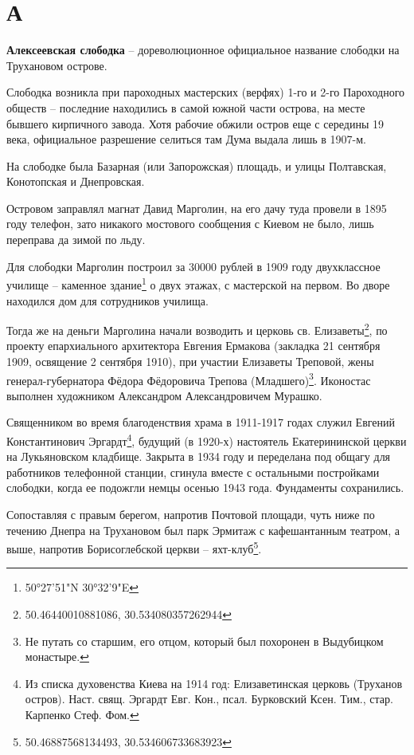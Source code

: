 \chapter*{А}

\textbf{Алексеевская слободка} –  дореволюционное официальное название слободки на Трухановом острове.

Слободка возникла при пароходных мастерских (верфях) 1-го и 2-го Пароходного обществ – последние находились в самой южной части острова, на месте бывшего кирпичного завода. Хотя рабочие обжили остров еще с середины 19 века, официальное разрешение селиться там Дума выдала лишь в 1907-м. 

На слободке была Базарная (или Запорожская) площадь, и улицы Полтавская, Конотопская и Днепровская.

Островом заправлял магнат Давид Марголин, на его дачу туда провели в 1895 году телефон, зато никакого мостового сообщения с Киевом не было, лишь переправа да зимой по льду.

Для слободки Марголин построил за 30000 рублей в 1909 году двухклассное училище – каменное здание\footnote{50°27'51"N 30°32'9"E} о двух этажах, с мастерской на первом. Во дворе находился дом для сотрудников училища.

Тогда же на деньги Марголина начали возводить и церковь св. Елизаветы\footnote{50.46440010881086, 30.534080357262944}, по проекту епархиального архитектора Евгения Ермакова (закладка 21 сентября 1909, освящение 2 сентября 1910), при участии Елизаветы Треповой, жены генерал-губернатора Фёдора Фёдоровича Трепова (Младшего)\footnote{Не путать со старшим, его отцом, который был похоронен в Выдубицком монастыре.}. Иконостас выполнен художником Александром Александровичем Мурашко. 

Священником во время благоденствия храма в 1911-1917 годах служил Евгений Константинович Эргардт\footnote{Из списка духовенства Киева на 1914 год: Елизаветинская церковь (Труханов остров). Наст. свящ. Эргардт Евг. Кон., псал. Бурковский Ксен. Тим., стар. Карпенко Стеф. Фом.}, будущий (в 1920-х) настоятель Екатерининской церкви на Лукьяновском кладбище. Закрыта в 1934 году и переделана под общагу для работников телефонной станции, сгинула вместе с остальными постройками слободки, когда ее подожгли немцы осенью 1943 года. Фундаменты сохранились.

Сопоставляя с правым берегом, напротив Почтовой площади, чуть ниже по течению Днепра на Трухановом был парк Эрмитаж с кафешантанным театром, а выше, напротив Борисоглебской церкви – яхт-клуб\footnote{50.46887568134493, 30.534606733683923}.\\

